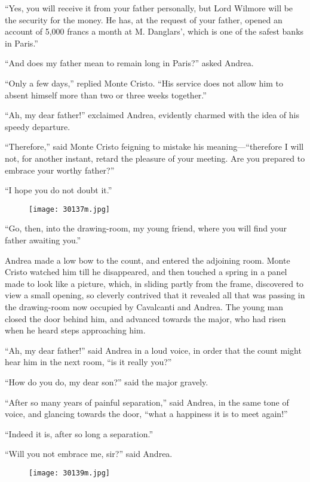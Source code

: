 “Yes, you will receive it from your father personally, but Lord Wilmore
will be the security for the money. He has, at the request of your
father, opened an account of 5,000 francs a month at M. Danglars’,
which is one of the safest banks in Paris.”

“And does my father mean to remain long in Paris?” asked Andrea.

“Only a few days,” replied Monte Cristo. “His service does not allow
him to absent himself more than two or three weeks together.”

“Ah, my dear father!” exclaimed Andrea, evidently charmed with the idea
of his speedy departure.

“Therefore,” said Monte Cristo feigning to mistake his
meaning—“therefore I will not, for another instant, retard the pleasure
of your meeting. Are you prepared to embrace your worthy father?”

“I hope you do not doubt it.”

\begin{figure}[ht]
\texttt{[image: 30137m.jpg]}
\end{figure}

“Go, then, into the drawing-room, my young friend, where you will find
your father awaiting you.”

Andrea made a low bow to the count, and entered the adjoining room.
Monte Cristo watched him till he disappeared, and then touched a spring
in a panel made to look like a picture, which, in sliding partly from
the frame, discovered to view a small opening, so cleverly contrived
that it revealed all that was passing in the drawing-room now occupied
by Cavalcanti and Andrea. The young man closed the door behind him, and
advanced towards the major, who had risen when he heard steps
approaching him.

“Ah, my dear father!” said Andrea in a loud voice, in order that the
count might hear him in the next room, “is it really you?”

“How do you do, my dear son?” said the major gravely.

“After so many years of painful separation,” said Andrea, in the same
tone of voice, and glancing towards the door, “what a happiness it is
to meet again!”

“Indeed it is, after so long a separation.”

“Will you not embrace me, sir?” said Andrea.

\begin{figure}[ht]
\texttt{[image: 30139m.jpg]}
\end{figure}


